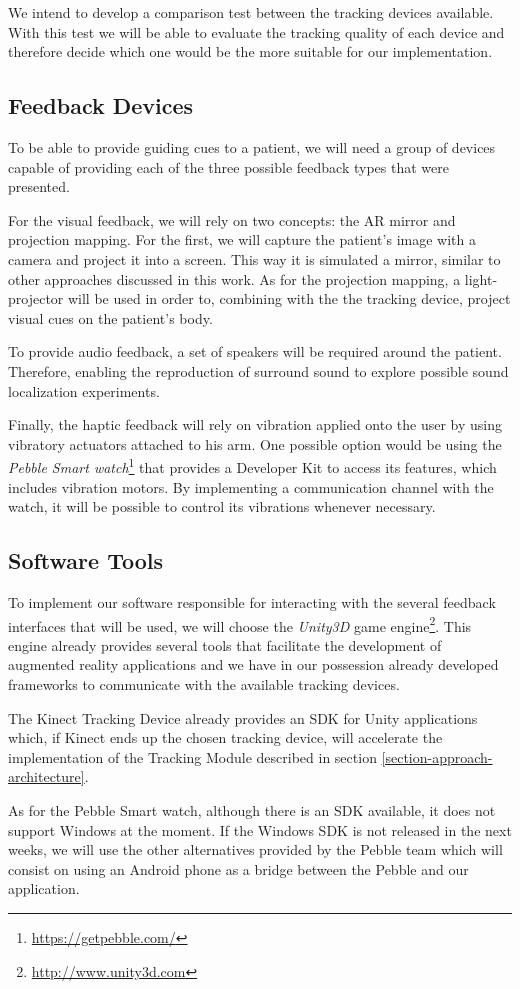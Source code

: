 We intend to develop a comparison test between the tracking devices available. With this test we will be able to evaluate the tracking quality of each device and therefore decide which one would be the more suitable for our implementation. 

\subsection{Feedback Devices}

To be able to provide guiding cues to a patient, we will need a group of devices capable of providing each of the three possible feedback types that were presented.

For the visual feedback, we will rely on two concepts: the \ac{AR} mirror and projection mapping. 
For the first, we will capture the patient's image with a camera and project it into a screen. 
This way it is simulated a mirror, similar to other approaches discussed in this work.
As for the projection mapping, a light-projector will be used in order to, combining with 
the the tracking device, project visual cues on the patient's body.

To provide audio feedback, a set of speakers will be required around the patient. 
Therefore, enabling the reproduction of surround sound to explore possible sound localization experiments.

Finally, the haptic feedback will rely on vibration applied onto the user by using 
vibratory actuators attached to his arm. 
One possible option would be using the \textit{Pebble Smart watch}\footnote{\url{https://getpebble.com/}} that 
provides a Developer Kit to access its features, which includes vibration motors. 
By implementing a communication channel with the watch, it will be possible to control its vibrations whenever necessary.

\subsection{Software Tools}

To implement our software responsible for interacting with the several feedback interfaces that 
will be used, we will choose the \emph{Unity3D} game engine\footnote{\url{http://www.unity3d.com}}. 
This engine already provides several tools that facilitate the development of augmented reality applications and we have in our possession already developed frameworks to communicate with the available tracking devices.

The Kinect Tracking Device already provides an SDK for Unity applications which, if Kinect ends up the chosen tracking device, will accelerate the implementation of the Tracking Module described in section \ref{section-approach-architecture}.

As for the Pebble Smart watch, although there is an SDK available, it does not support Windows at the moment. If the Windows SDK is not released in the next weeks, we will use the other alternatives provided by the Pebble team which will consist on using an Android phone as a bridge between the Pebble and our application.